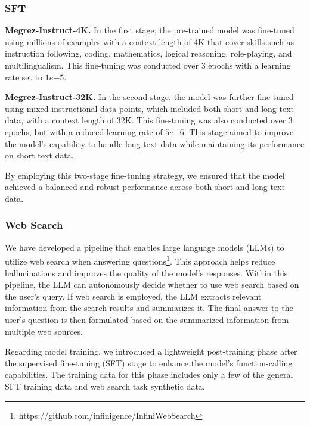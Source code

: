 \subsubsection{SFT}

\textbf{Megrez-Instruct-4K.} In the first stage, the pre-trained model was fine-tuned using millions of examples with a context length of 4K that cover skills such as instruction following, coding, mathematics, logical reasoning, role-playing, and multilingualism. This fine-tuning was conducted over 3 epochs with a learning rate set to \(1e{-5}\).

\textbf{Megrez-Instruct-32K.} In the second stage, the model was further fine-tuned using mixed instructional data points, which included both short and long text data, with a context length of 32K. This fine-tuning was also conducted over 3 epochs, but with a reduced learning rate of \(5e{-6}\). This stage aimed to improve the model's capability to handle long text data while maintaining its performance on short text data.

By employing this two-stage fine-tuning strategy, we ensured that the model achieved a balanced and robust performance across both short and long text data.

\subsubsection{Web Search}

We have developed a pipeline that enables large language models (LLMs) to utilize web search when answering questions\footnote{https://github.com/infinigence/InfiniWebSearch}. This approach helps reduce hallucinations and improves the quality of the model's responses. Within this pipeline, the LLM can autonomously decide whether to use web search based on the user's query. If web search is employed, the LLM extracts relevant information from the search results and summarizes it. The final answer to the user's question is then formulated based on the summarized information from multiple web sources.

Regarding model training, we introduced a lightweight post-training phase after the supervised fine-tuning (SFT) stage to enhance the model's function-calling capabilities. The training data for this phase includes only a few of the general SFT training data and web search task synthetic data.